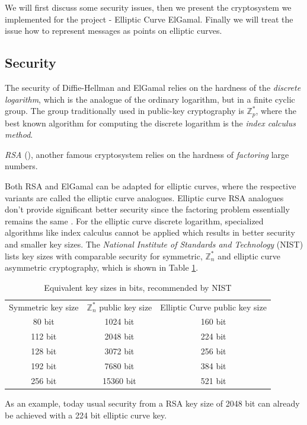 \documentclass[11pt,english]{article}
\begin{document}
We will first discuss some security issues, then we present the cryptosystem we implemented for the project - Elliptic Curve ElGamal. Finally we will treat the issue how to represent messages as points on elliptic curves.

\subsection{Security}
The security of Diffie-Hellman and ElGamal relies on the hardness of the \emph{discrete logarithm}, which is the analogue of the ordinary logarithm, but in a finite cyclic group. The group traditionally used in public-key cryptography is $\mathbb{Z}_p^*$, where the best known algorithm for computing the discrete logarithm is the \emph{index calculus method}.

\emph{RSA} (\cite{Rivest78amethod}), another famous cryptosystem relies on the hardness of \emph{factoring} large numbers.

Both RSA and ElGamal can be adapted for elliptic curves, where the respective variants are called the elliptic curve analogues. Elliptic curve RSA analogues don't provide significant better security since the factoring problem essentially remains the same \cite{343485}. For the elliptic curve discrete logarithm, specialized algorithms like index calculus cannot be applied which results in better security and smaller key sizes. The \emph{National Institute of Standards and Technology} (NIST) lists key sizes with comparable security for symmetric, $\mathbb{Z}_n^*$ and elliptic curve asymmetric cryptography, which is shown in Table \ref{eqks}.

\begin{table}
\centering
\begin{tabular}{c|c|c}
Symmetric key size & $\mathbb{Z}_{n}^{*}$ public key size & Elliptic Curve public key size \\ \cline{1-3}
80 bit & 1024 bit & 160 bit \\ 
112 bit & 2048 bit & 224 bit \\ 
128 bit & 3072 bit & 256 bit \\ 
192 bit & 7680 bit & 384 bit \\ 
256 bit & 15360 bit & 521 bit
\end{tabular}
\caption{Equivalent key sizes in bits, recommended by NIST}
\label{eqks}
\end{table}

As an example, today usual security from a RSA key size of 2048 bit can already be achieved with a 224 bit elliptic curve key.
\end{document}
